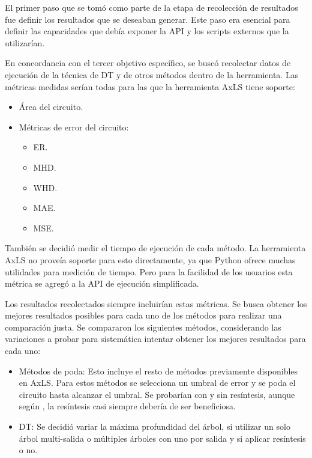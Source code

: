 El primer paso que se tomó como parte de la etapa de recolección de resultados
fue definir los resultados que se deseaban generar. Este paso era esencial para
definir las capacidades que debía exponer la API y los scripts externos que la
utilizarían.

En concordancia con el tercer objetivo específico, se buscó recolectar datos de
ejecución de la técnica de DT y de otros métodos dentro de la herramienta. Las
métricas medidas serían todas para las que la herramienta AxLS tiene soporte:

\begin{itemize}
  \item Área del circuito.
  \item Métricas de error del circuito:
    \begin{itemize}
      \item ER.
      \item MHD.
      \item WHD.
      \item MAE.
      \item MSE.
    \end{itemize}
\end{itemize}

También se decidió medir el tiempo de ejecución de cada método. La herramienta
AxLS no proveía soporte para esto directamente, ya que Python ofrece muchas
utilidades para medición de tiempo. Pero para la facilidad de los usuarios esta
métrica se agregó a la API de ejecución simplificada.

Los resultados recolectados siempre incluirían estas métricas. Se busca obtener
los mejores resultados posibles para cada uno de los métodos para realizar
una comparación justa. Se compararon los siguientes métodos, considerando las
variaciones a probar para sistemática intentar obtener los mejores resultados
para cada uno:

\begin{itemize}
  \item Métodos de poda: Esto incluye el resto de métodos previamente
    disponibles en AxLS. Para estos métodos se selecciona un umbral de error y
    se poda el circuito hasta alcanzar el umbral. Se probarían con y sin
    resíntesis, aunque según \cite{morales-monge_improving_2024}, la resíntesis
    casi siempre debería de ser beneficiosa.
  \item DT: Se decidió variar la máxima profundidad del árbol, si utilizar un
    solo árbol multi-salida o múltiples árboles con uno por salida y si aplicar
    resíntesis o no.
\end{itemize}

